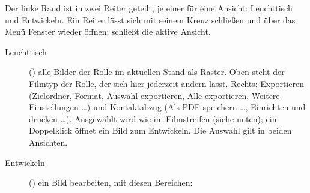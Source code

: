 \documentclass[a4paper,11pt,parskip=half,DIV=12]{scrartcl}
\newcommand{\menu}[1]{\textsf{#1}}                    %
\newcommand{\taste}[1]{\fbox{\footnotesize\textsf{#1}}} %
\begin{document}
Der linke Rand ist in zwei Reiter geteilt, je einer für eine Ansicht: \menu{Leuchttisch} und
\menu{Entwickeln}. Ein Reiter lässt sich
mit seinem Kreuz schließen und über das Menü \menu{Fenster} wieder öffnen; \taste{Strg+W}
schließt die aktive Ansicht.
\begin{description}
  \item[Leuchttisch] (\taste{G}) alle Bilder der Rolle im aktuellen Stand als Raster. Oben steht
        der \menu{Filmtyp der Rolle}, der sich hier jederzeit ändern lässt. Rechts:
        \menu{Exportieren} (Zielordner, Format, \menu{Auswahl exportieren}, \menu{Alle
        exportieren}, \menu{Weitere Einstellungen …}) und \menu{Kontaktabzug} (\menu{Als PDF
        speichern …}, \menu{Einrichten und drucken …}). Ausgewählt wird wie im Filmstreifen
        (siehe unten); ein Doppelklick öffnet ein Bild zum Entwickeln. Die Auswahl gilt in
        beiden Ansichten.
  \item[Entwickeln] (\taste{E}) ein Bild bearbeiten, mit diesen Bereichen:
\end{description}
\end{document}
